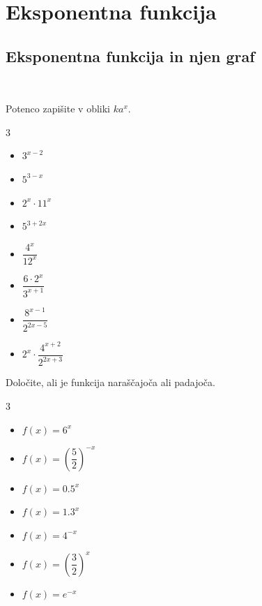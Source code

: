\chapter{Eksponentna funkcija}


\section{Eksponentna funkcija in njen graf}
\newpage ~

\newpage

    \begin{naloga}
        Potenco zapišite v obliki $ka^x$.
        \begin{multicols}{3}
            
        \begin{itemize}
            \item $3^{x-2}$
            \item $5^{3-x}$
            \item $2^x\cdot 11^x$
            \item $5^{3+2x}$
            \item $\dfrac{4^x}{12^x}$
            \item $\dfrac{6\cdot 2^x}{3^{x+1}}$
            \item $\dfrac{8^{x-1}}{2^{2x-5}}$
            \item $2^x\cdot\dfrac{4^{x+2}}{2^{2x+3}}$
        \end{itemize}
        \end{multicols}

    \end{naloga}


    \begin{naloga}
        Določite, ali je funkcija naraščajoča ali padajoča.
        \begin{multicols}{3}
            
        \begin{itemize}
            \item $f(x)=6^x$
            \item $f(x)=\left(\dfrac{5}{2}\right)^{-x}$
            \item $f(x)=0.5^x$
            \item $f(x)=1.3^x$
            \item $f(x)=4^{-x}$
            \item $f(x)=\left(\dfrac{3}{2}\right)^x$
            \item $f(x)=e^{-x}$
        \end{itemize}
        \end{multicols}

    \end{naloga}


